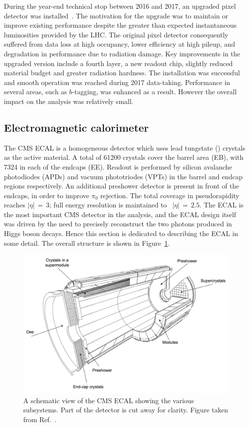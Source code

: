During the year-end technical stop between 2016 and 2017, an upgraded pixel detector was installed~\cite{PixelUpgrade}.
The motivation for the upgrade was to maintain or improve existing performance despite the greater than expected instantaneous luminosities provided by the LHC.
The original pixel detector consequently suffered from data loss at high occupancy, lower efficiency at high pileup, and degradation in performance due to radiation damage.
Key improvements in the upgraded version include a fourth layer, a new readout chip, slightly reduced material budget and greater radiation hardness.
The installation was successful and smooth operation was reached during 2017 data-taking.
Performance in several areas, such as $b$-tagging, was enhanced as a result.
However the overall impact on the \Hgg analysis was relatively small.

\subsection{Electromagnetic calorimeter}

The CMS ECAL is a homogeneous detector which uses lead tungstate (\pbw) crystals as the active material.
A total of 61200 crystals cover the barrel area (EB), with 7324 in each of the endcaps (EE).
Readout is performed by silicon avalanche photodiodes (APDs) and vacuum phototriodes (VPTs) in the barrel and endcap regions respectively.
An additional preshower detector is present in front of the endcaps, in order to improve $\pi_0$ rejection.
The total coverage in pseudorapidity reaches $|\eta|\,=\,3$; full energy resolution is maintained to ~$|\eta|\,=\,2.5$.
The ECAL is the most important CMS detector in the \Hgg analysis, 
and the ECAL design itself was driven by the need to precisely reconstruct the two photons produced in Higgs boson decays.
Hence this section is dedicated to describing the ECAL in some detail.
The overall structure is shown in Figure~\ref{fig:detector_ECALschematic}.

\begin{figure}[h!]
  \centering
  \includegraphics[width=\textwidth]{Figures/Detector/ECALschematic.png}
  \caption[Schematic view of the CMS ECAL.]
  {A schematic view of the CMS ECAL showing the various subsystems.
  Part of the detector is cut away for clarity.
  Figure taken from Ref.~\cite{ECALperformance}.}
  \label{fig:detector_ECALschematic}
\end{figure}

